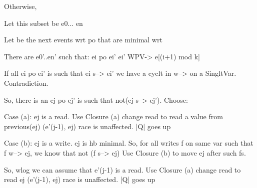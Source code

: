 Otherwise, 

Let this subset be e0... en

Let  be the next events wrt po that are minimal wrt 

  There are e0'..en'  such that:
                ei   po  ei'
                ei'  WPV-> e[(i+1) mod k]

  If all  ei   po  ei' is such that
           ei s--> ei'
  we have a  cyclt in w--> on a SingltVar.  Contradiction.


  So, there is an ej po ej' is such that not(ej s--> ej').  Choose:

  Case (a): ej is a read.  
                  Use Closure (a) change read to read a value from previous(ej)
                  (e'(j-1), ej) race is unaffected.
                  |Q| goes up

  Case (b): ej is a write.
                 ej is hb minimal.
                 So, for all writes f on same var such that f w--> ej, we know that not (f s--> ej) 
                 Use Closure (b) to move ej after such fs.

                 So, wlog we can assume that e'(j-1) is a read.  
                 Use Closure (a) change read to read ej
                 (e'(j-1), ej) race is unaffected.
                 |Q| goes up

      